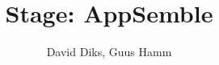 \documentclass[10pt,a4paper]{report}
\author{David Diks, Guus Hamm}
\title{Stage: AppSemble}
\begin{document}
	\maketitle
	
	\tableofcontents
	\newpage

	
	
	\newpage
	\begin{appendices}
		
	\end{appendices}
	
\end{document}
